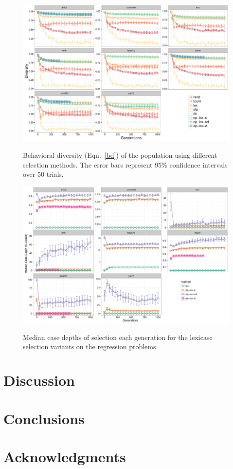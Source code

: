 \documentclass[twoside]{article}
\begin{document}
\begin{figure}
\centering
  \includegraphics[width=\textwidth]{figs/regression_novelty.pdf}\\
 \caption{Behavioral diversity (Eqn.~\ref{bd}) of the population using different selection methods. The error bars represent 95\% confidence intervals over 50 trials.}\label{fig:train}
\end{figure}

\begin{figure}
\centering
  \includegraphics[width=\textwidth]{figs/median_case_depth.pdf}\\
 \caption{Median case depths of selection each generation for the lexicase selection variants on the regression problems.}\label{fig:case_depth}
\end{figure}

\section{Discussion}\label{s:discuss}


\section{Conclusions}\label{s:conclusion}

\section{Acknowledgments}





\end{document}
